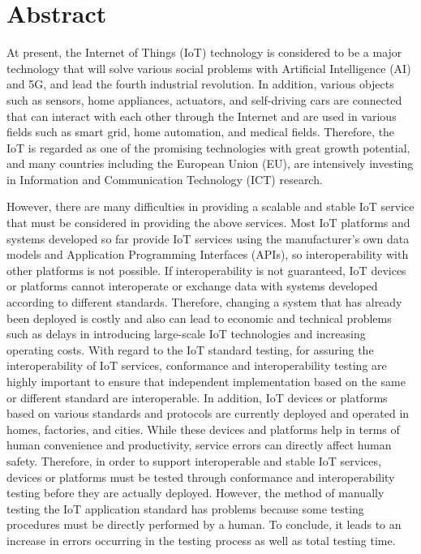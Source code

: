 
\section*{Abstract}
At present, the Internet of Things (IoT) technology is considered to be a major technology that will solve various social problems with Artificial Intelligence (AI) and 5G, and lead the fourth industrial revolution. In addition, various objects such as sensors, home appliances, actuators, and self-driving cars are connected that can interact with each other through the Internet and are used in various fields such as smart grid, home automation, and medical fields. Therefore, the IoT is regarded as one of the promising technologies with great growth potential, and many countries including the European Union (EU), are intensively investing in Information and Communication Technology (ICT) research.

However, there are many difficulties in providing a scalable and stable IoT service that must be considered in providing the above services. Most IoT platforms and systems developed so far provide IoT services using the manufacturer's own data models and Application Programming Interfaces (APIs), so interoperability with other platforms is not possible. If interoperability is not guaranteed, IoT devices or platforms cannot interoperate or exchange data with systems developed according to different standards. Therefore, changing a system that has already been deployed is costly and also can lead to economic and technical problems such as delays in introducing large-scale IoT technologies and increasing operating costs. With regard to the IoT standard testing, for assuring the interoperability of IoT services, conformance and interoperability testing are highly important to ensure that independent implementation based on the same or different standard are interoperable. In addition, IoT devices or platforms based on various standards and protocols are currently deployed and operated in homes, factories, and cities. While these devices and platforms help in terms of human convenience and productivity, service errors can directly affect human safety. Therefore, in order to support interoperable and stable IoT services, devices or platforms must be tested through conformance and interoperability testing before they are actually deployed. However, the method of manually testing the IoT application standard has problems because some testing procedures must be directly performed by a human. To conclude, it leads to an increase in errors occurring in the testing process as well as total testing time.

